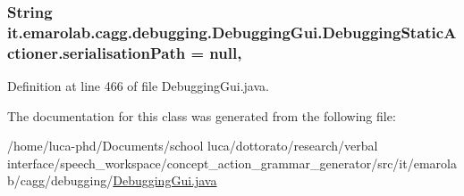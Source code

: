 \hypertarget{classit_1_1emarolab_1_1cagg_1_1debugging_1_1DebuggingGui_1_1DebuggingStaticActioner_a1b60d27a5e9869f6e975afd8cb6ab286}{
\subsubsection[{serialisation\-Path}]{\setlength{\rightskip}{0pt plus 5cm}String it.\-emarolab.\-cagg.\-debugging.\-Debugging\-Gui.\-Debugging\-Static\-Actioner.\-serialisation\-Path = null\hspace{0.3cm}{\ttfamily [static]}, {\ttfamily [private]}}}\label{classit_1_1emarolab_1_1cagg_1_1debugging_1_1DebuggingGui_1_1DebuggingStaticActioner_a1b60d27a5e9869f6e975afd8cb6ab286}


Definition at line 466 of file Debugging\-Gui.\-java.



The documentation for this class was generated from the following file\-:\begin{DoxyCompactItemize}
\item 
/home/luca-\/phd/\-Documents/school luca/dottorato/research/verbal interface/speech\-\_\-workspace/concept\-\_\-action\-\_\-grammar\-\_\-generator/src/it/emarolab/cagg/debugging/\hyperlink{DebuggingGui_8java}{Debugging\-Gui.\-java}\end{DoxyCompactItemize}
